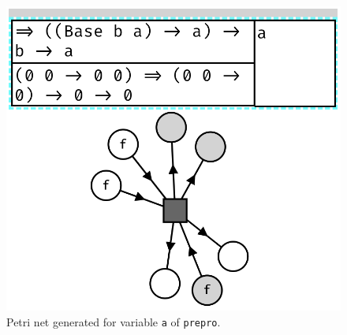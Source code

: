 \documentclass[11pt,openright,hidelinks,a4paper]{article}
\begin{document}
\begin{figure}[H]
\begin{center}
\includegraphics[scale=0.45]{prepro}
\end{center}
\caption{Petri net generated for variable \lstinline{a} of \lstinline{prepro}.}
\label{fig:prepro}
\end{figure}
\end{document}
